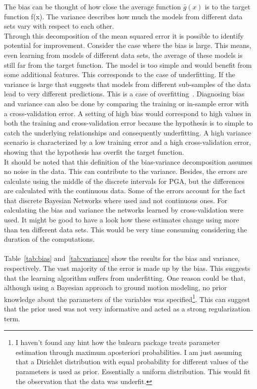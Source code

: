 The bias can be thought of how close the average function $\bar{g}(x)$ is to the target function f(x). The variance describes how much the models from different data sets vary with respect to each other.\\
Through this decomposition of the mean squared error it is possible to identify potential for improvement. Consider the case where the bias is large. This means, even learning from models of different data sets, the average of these models is still far from the target function. The model is too simple and would benefit from some additional features. This corresponds to the case of underfitting. If the variance is large that suggests that models from different sub-samples of the data lead to very different predictions. This is a case of overfitting~\citep{LearningFromData}.
Diagnosing bias and variance can also be done by comparing the training or in-sample error with a cross-validation error. A setting of high bias would correspond to high values in both the training and cross-validation error because the hypothesis is to simple to catch the underlying relationships and consequently underfitting. A high variance scenario is characterized by a low training error and a high cross-validation error, showing that the hypothesis has overfit the target function.\\
It should be noted that this definition of the bias-variance decomposition assumes no noise in the data. This can contribute to the variance. Besides, the errors are calculate using the middle of the discrete intervals for PGA, but the differences are calculated with the continuous data. Some of the errors account for the fact that discrete Bayesian Networks where used and not continuous ones. For calculating the bias and variance the networks learned by cross-validation were used. It might be good to have a look how these estimates change using more than ten different data sets. This would be very time consuming considering the duration of the computations.\\\\

Table~\ref{tab:bias} and~\ref{tab:variance} show the results for the bias and variance, respectively. The vast majority of the error is made up by the bias. This suggests that the learning algorithm suffers from underfitting. One reason could be that, although using a Bayesian approach to ground motion modeling, no prior knowledge about the parameters of the variables was specified\footnote{I haven't found any hint how the bnlearn package treats parameter estimation through maximum aposteriori probabilities. I am just assuming that a Dirichlet distribution with equal probability for different values of the parameters is used as prior. Essentially a uniform distribution. This would fit the observation that the data was underfit.}. This can suggest that the prior used was not very informative and acted as a strong regularization term.

